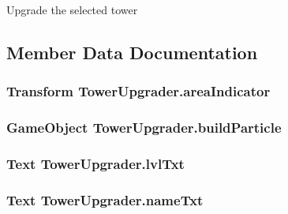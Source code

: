 Upgrade the selected tower 



\subsection{Member Data Documentation}
\subsubsection[{\texorpdfstring{area\+Indicator}{areaIndicator}}]{\setlength{\rightskip}{0pt plus 5cm}Transform Tower\+Upgrader.\+area\+Indicator}\hypertarget{class_tower_upgrader_a464c95a14d880293e19ba905e07ceeaa}{}\label{class_tower_upgrader_a464c95a14d880293e19ba905e07ceeaa}
\subsubsection[{\texorpdfstring{build\+Particle}{buildParticle}}]{\setlength{\rightskip}{0pt plus 5cm}Game\+Object Tower\+Upgrader.\+build\+Particle}\hypertarget{class_tower_upgrader_aaa8c4af8401488277f1e03ed8415b482}{}\label{class_tower_upgrader_aaa8c4af8401488277f1e03ed8415b482}
\subsubsection[{\texorpdfstring{lvl\+Txt}{lvlTxt}}]{\setlength{\rightskip}{0pt plus 5cm}Text Tower\+Upgrader.\+lvl\+Txt}\hypertarget{class_tower_upgrader_a9001d72ef7a9c15331372f498ddd8261}{}\label{class_tower_upgrader_a9001d72ef7a9c15331372f498ddd8261}
\subsubsection[{\texorpdfstring{name\+Txt}{nameTxt}}]{\setlength{\rightskip}{0pt plus 5cm}Text Tower\+Upgrader.\+name\+Txt}\hypertarget{class_tower_upgrader_adc57841b322ae11a9e4be653b5e9ea58}{}\label{class_tower_upgrader_adc57841b322ae11a9e4be653b5e9ea58}
